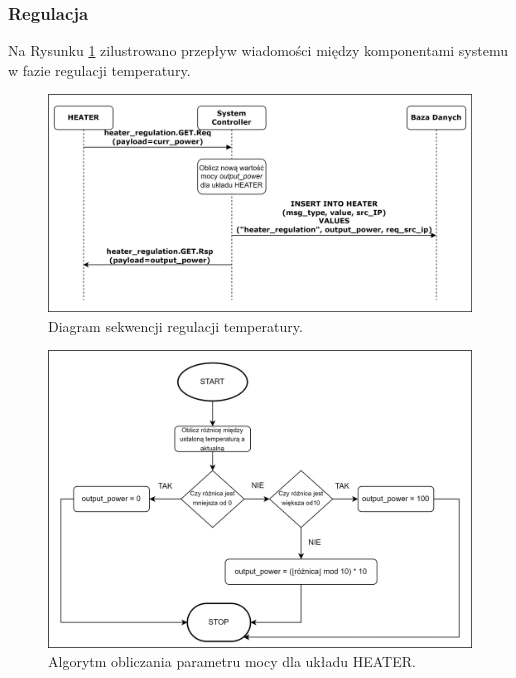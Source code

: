         \subsubsection{Regulacja}

            Na Rysunku \ref{fig:seq-heater-regulate} zilustrowano przepływ wiadomości między komponentami systemu w fazie regulacji temperatury.

            \begin{figure}[H]
                \centering
                \includegraphics[width=0.8\linewidth]{graphics/sequence-diagrams/heater-regulate-seq.png}
                \caption{Diagram sekwencji regulacji temperatury.}
                \label{fig:seq-heater-regulate}
            \end{figure}

            \begin{figure}[H]
                \centering
                \includegraphics[width=0.8\linewidth]{graphics/heater-block-diagram.png}
                \caption{Algorytm obliczania parametru mocy dla układu HEATER.}
                \label{fig:seq-heater-algo}
            \end{figure}

